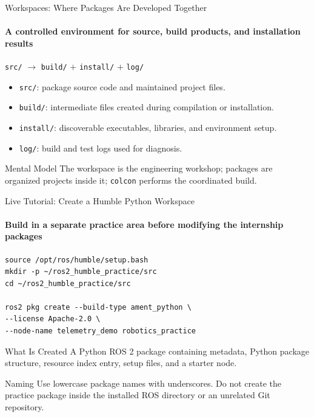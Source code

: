 \begin{frame}{Workspaces: Where Packages Are Developed Together}
\framesubtitle{A controlled environment for source, build products, and installation results}
\begin{center}
\texttt{src/} $\longrightarrow$ \texttt{build/} $+$ \texttt{install/} $+$ \texttt{log/}
\end{center}
\begin{itemize}
\item \texttt{src/}: package source code and maintained project files.
\item \texttt{build/}: intermediate files created during compilation or installation.
\item \texttt{install/}: discoverable executables, libraries, and environment setup.
\item \texttt{log/}: build and test logs used for diagnosis.
\end{itemize}
\begin{exampleblock}{Mental Model}
The workspace is the engineering workshop; packages are organized projects inside it; \texttt{colcon} performs the coordinated build.
\end{exampleblock}
\end{frame}

\begin{frame}[fragile]{Live Tutorial: Create a Humble Python Workspace}
\framesubtitle{Build in a separate practice area before modifying the internship packages}
\scriptsize
\begin{verbatim}
source /opt/ros/humble/setup.bash
mkdir -p ~/ros2_humble_practice/src
cd ~/ros2_humble_practice/src

ros2 pkg create --build-type ament_python \
--license Apache-2.0 \
--node-name telemetry_demo robotics_practice
\end{verbatim}
\begin{exampleblock}{What Is Created}
A Python ROS 2 package containing metadata, Python package structure, resource index entry, setup files, and a starter node.
\end{exampleblock}
\begin{alertblock}{Naming}
Use lowercase package names with underscores. Do not create the practice package inside the installed ROS directory or an unrelated Git repository.
\end{alertblock}
\end{frame}

